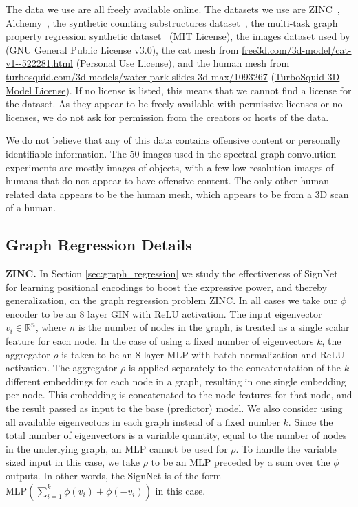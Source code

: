 \documentclass{article} \usepackage{iclr2023_conference,times}
\newcommand{\mrm}[1]{\mathrm{#1}}
\begin{document}
The data we use are all freely available online. The datasets we use are 
ZINC~\citep{irwin2012zinc},
Alchemy~\citep{chen2019alchemy},
the synthetic counting substructures dataset~\citep{chen2020can},
the multi-task graph property regression synthetic dataset~\citep{corso2020principal} (MIT License),
the images dataset used by \citet{balcilar2020analyzing} (GNU General Public License v3.0),
the cat mesh from \url{free3d.com/3d-model/cat-v1--522281.html} (Personal Use License),
and the human mesh from \url{turbosquid.com/3d-models/water-park-slides-3d-max/1093267} (\href{https://blog.turbosquid.com/turbosquid-3d-model-license/}{TurboSquid 3D Model License}). If no license is listed, this means that we cannot find a license for the dataset. As they appear to be freely available with permissive licenses or no licenses, we do not ask for permission from the creators or hosts of the data.

We do not believe that any of this data contains offensive content or personally identifiable information. The 50 images used in the spectral graph convolution experiments are mostly images of objects, with a few low resolution images of humans that do not appear to have offensive content. The only other human-related data appears to be the human mesh, which appears to be from a 3D scan of a human. 

\subsection{Graph Regression Details}\label{appendix:graph_regression}

\textbf{ZINC.} In Section \ref{sec:graph_regression} we study the effectiveness of SignNet for learning positional encodings to boost the expressive power, and thereby generalization, on the graph regression problem ZINC. In all cases we take our $\phi$ encoder to be an $8$ layer GIN with ReLU activation. The input eigenvector $v_i \in \mathbb{R}^n$, where $n$ is the number of nodes in the graph, is treated as a single scalar feature for each node. In the case of using a fixed number of eigenvectors $k$, the aggregator $\rho$ is taken to be an $8$ layer MLP with batch normalization and ReLU activation. The aggregator  $\rho$ is applied separately to the concatenatation of the $k$ different embeddings for each node in a graph, resulting in one single embedding per node. This embedding  is concatenated to the node features for 
that node, and the result passed as input to the base (predictor) model. We also consider using all available eigenvectors in each graph instead of a fixed number $k$. Since the total number of eigenvectors is a variable quantity, equal to the number of  nodes in the underlying graph, an MLP cannot be used for $\rho$. 
To handle the variable sized input in this case, we take $\rho$ to be an MLP preceded by a sum over the $\phi$ outputs. In other words, the SignNet is of the form $\mrm{MLP}\left(\sum_{i=1}^k \phi(v_i) + \phi(-v_i) \right)$ in this case.
\end{document}
